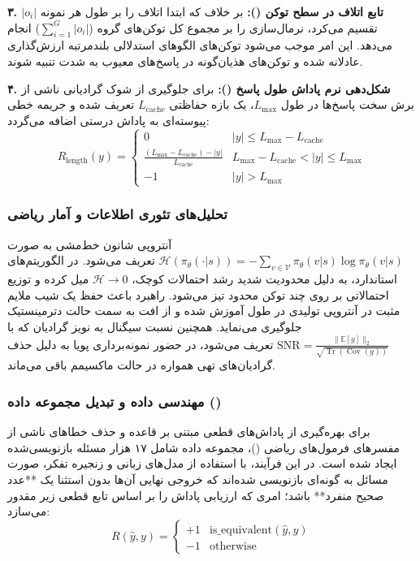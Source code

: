 \textbf{۳. تابع اتلاف در سطح توکن ():}
بر خلاف  که ابتدا اتلاف را بر طول هر نمونه $|o_i|$ تقسیم می‌کرد،  نرمال‌سازی را بر مجموع کل توکن‌های گروه ($\sum_{i=1}^G |o_i|$) انجام می‌دهد. این امر موجب می‌شود توکن‌های الگوهای استدلالی بلندمرتبه ارزش‌گذاری عادلانه شده و توکن‌های هذیان‌گونه در پاسخ‌های معیوب به شدت تنبیه شوند.

\textbf{۴. شکل‌دهی نرم پاداش طول پاسخ ():}
برای جلوگیری از شوک گرادیانی ناشی از برش سخت پاسخ‌ها در طول $L_{\text{max}}$، یک بازه حفاظتی $L_{\text{cache}}$ تعریف شده و جریمه خطی پیوسته‌ای به پاداش درستی اضافه می‌گردد:
\begin{equation}
	R_{\text{length}}(y) = \begin{cases} 
		0 & |y| \le L_{\text{max}} - L_{\text{cache}} \\
		\frac{(L_{\text{max}} - L_{\text{cache}}) - |y|}{L_{\text{cache}}} & L_{\text{max}} - L_{\text{cache}} < |y| \le L_{\text{max}} \\
		-1 & |y| > L_{\text{max}}
	\end{cases}
\end{equation}

\subsubsection*{تحلیل‌های تئوری اطلاعات و آمار ریاضی}

آنتروپی شانون خط‌مشی به صورت $\mathcal{H}(\pi_\theta(\cdot | s)) = - \sum_{v \in \mathcal{V}} \pi_\theta(v | s) \log \pi_\theta(v | s)$ تعریف می‌شود. در الگوریتم‌های استاندارد، به دلیل محدودیت شدید رشد احتمالات کوچک، $\mathcal{H} \to 0$ میل کرده و توزیع احتمالاتی بر روی چند توکن محدود تیز می‌شود. راهبرد  باعث حفظ یک شیب ملایم مثبت در آنتروپی تولیدی در طول آموزش شده و از افت به سمت حالت دترمینستیک جلوگیری می‌نماید. همچنین نسبت سیگنال به نویز گرادیان که با $\text{SNR} = \frac{\|\mathbb{E}[g]\|_2}{\sqrt{\operatorname{Tr}(\operatorname{Cov}(g))}}$ تعریف می‌شود، در حضور نمونه‌برداری پویا به دلیل حذف گرادیان‌های تهی همواره در حالت ماکسیمم باقی می‌ماند.

\subsubsection*{مهندسی داده و تبدیل مجموعه داده ()}

برای بهره‌گیری از پاداش‌های قطعی مبتنی بر قاعده و حذف خطاهای ناشی از مفسرهای فرمول‌های ریاضی ()، مجموعه داده  شامل ۱۷ هزار مسئله بازنویسی‌شده ایجاد شده است. در این فرآیند، با استفاده از مدل‌های زبانی و زنجیره تفکر، صورت مسائل به گونه‌ای بازنویسی شده‌اند که خروجی نهایی آن‌ها بدون استثنا یک **عدد صحیح منفرد** باشد؛ امری که ارزیابی پاداش را بر اساس تابع قطعی زیر مقدور می‌سازد:
\begin{equation}
	R(\hat{y}, y) = \begin{cases} +1 & \text{is\_equivalent}(\hat{y}, y) \\ -1 & \text{otherwise} \end{cases}
\end{equation}

